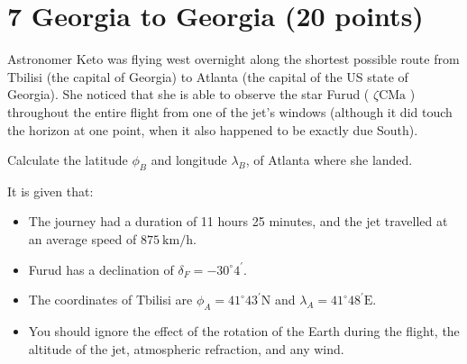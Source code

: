 \documentclass[10pt]{article}
\begin{document}
\section*{7 Georgia to Georgia (20 points)}
Astronomer Keto was flying west overnight along the shortest possible route from Tbilisi (the capital of Georgia) to Atlanta (the capital of the US state of Georgia). She noticed that she is able to observe the star Furud ( $\zeta \mathrm{CMa}$ ) throughout the entire flight from one of the jet's windows (although it did touch the horizon at one point, when it also happened to be exactly due South).

Calculate the latitude $\phi_{B}$ and longitude $\lambda_{B}$, of Atlanta where she landed.

It is given that:

\begin{itemize}
  \item The journey had a duration of 11 hours 25 minutes, and the jet travelled at an average speed of $875 \mathrm{~km} / \mathrm{h}$.
  \item Furud has a declination of $\delta_{F}=-30^{\circ} 4^{\prime}$.
  \item The coordinates of Tbilisi are $\phi_{A}=41^{\circ} 43^{\prime} \mathrm{N}$ and $\lambda_{A}=41^{\circ} 48^{\prime} \mathrm{E}$.
  \item You should ignore the effect of the rotation of the Earth during the flight, the altitude of the jet, atmospheric refraction, and any wind.
\end{itemize}
\end{document}
